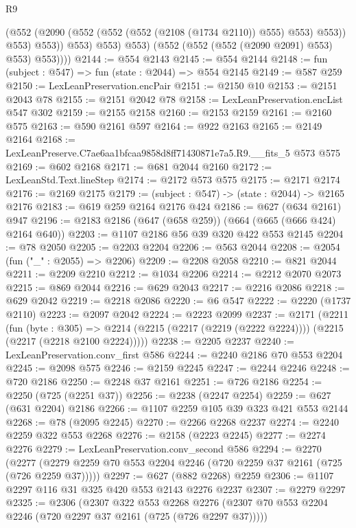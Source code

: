 \begin{lexlean}{R9}
\begin{coremodule}
                    (@552 (@2090 (@552 (@552 (@552 (@2108 (@1734 @2110)) @555) @553) @553)) @553)
                    @553))
                @553)
              @553)
            @553)
          (@552 (@552 (@552 (@2090 @2091) @553) @553) @553))))
@2144 := @554 @2143
@2145 := @554 @2144
@2148 := fun (subject : @547) => fun (state : @2044) => @554 @2145
@2149 := @587 @259
@2150 := LexLeanPreservation.encPair
@2151 := @2150 @10
@2153 := @2151 @2043 @78
@2155 := @2151 @2042 @78
@2158 := LexLeanPreservation.encList @547 @302
@2159 := @2155 @2158
@2160 := @2153 @2159
@2161 := @2160 @575
@2163 := @590 @2161 @597
@2164 := @922 @2163
@2165 := @2149 @2164
@2168 := LexLeanPreserve.C7ae6aa1bfcaa9858d8ff71430871e7a5.R9.__fits_5 @573 @575
@2169 := @602 @2168
@2171 := @681 @2044 @2160
@2172 := LexLeanStd.Text.lineStep
@2174 := @2172 @573 @575
@2175 := @2171 @2174
@2176 := @2169 @2175
@2179 := (subject : @547) -> (state : @2044) -> @2165 @2176
@2183 := @619 @259 @2164 @2176 @424
@2186 := @627 (@634 @2161) @947
@2196 := @2183 @2186 (@647 (@658 @259)) (@664 (@665 (@666 @424) @2164 @640))
@2203 := @1107 @2186 @56 @39 @320 @422 @553 @2145
@2204 := @78 @2050
@2205 := @2203 @2204
@2206 := @563 @2044
@2208 := @2054 (fun ("_" : @2055) => @2206)
@2209 := @2208 @2058
@2210 := @821 @2044
@2211 := @2209 @2210
@2212 := @1034 @2206
@2214 := @2212 @2070 @2073
@2215 := @869 @2044
@2216 := @629 @2043
@2217 := @2216 @2086
@2218 := @629 @2042
@2219 := @2218 @2086
@2220 := @6 @547
@2222 := @2220 (@1737 @2110)
@2223 := @2097 @2042
@2224 := @2223 @2099
@2237 := @2171
    (@2211
      (fun (byte : @305) =>
      @2214 (@2215 (@2217 (@2219 (@2222 @2224)))) (@2215 (@2217 (@2218 @2100 @2224)))))
@2238 := @2205 @2237
@2240 := LexLeanPreservation.conv_first @586
@2244 := @2240 @2186 @70 @553 @2204
@2245 := @2098 @575
@2246 := @2159 @2245
@2247 := @2244 @2246
@2248 := @720 @2186
@2250 := @2248 @37 @2161
@2251 := @726 @2186
@2254 := @2250 (@725 (@2251 @37))
@2256 := @2238 (@2247 @2254)
@2259 := @627 (@631 @2204) @2186
@2266 := @1107 @2259 @105 @39 @323 @421 @553 @2144
@2268 := @78 (@2095 @2245)
@2270 := @2266 @2268 @2237
@2274 := @2240 @2259 @322 @553 @2268
@2276 := @2158 (@2223 @2245)
@2277 := @2274 @2276
@2279 := LexLeanPreservation.conv_second @586
@2294 := @2270
    (@2277 (@2279 @2259 @70 @553 @2204 @2246 (@720 @2259 @37 @2161 (@725 (@726 @2259 @37)))))
@2297 := @627 (@882 @2268) @2259
@2306 := @1107 @2297 @116 @31 @325 @420 @553 @2143 @2276 @2237
@2307 := @2279 @2297
@2325 := @2306
    (@2307
      @322
      @553
      @2268
      @2276
      (@2307 @70 @553 @2204 @2246 (@720 @2297 @37 @2161 (@725 (@726 @2297 @37)))))

\end{coremodule}
\end{lexlean}
